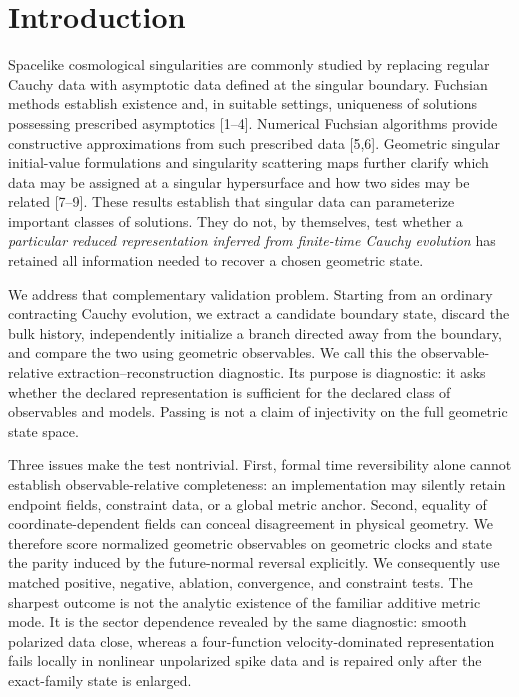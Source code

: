 \documentclass{iopjournal}
\begin{document}
\section{Introduction}
Spacelike cosmological singularities are commonly studied by replacing regular Cauchy data with asymptotic data defined at the singular boundary. Fuchsian methods establish existence and, in suitable settings, uniqueness of solutions possessing prescribed asymptotics [1--4]. Numerical Fuchsian algorithms provide constructive approximations from such prescribed data [5,6]. Geometric singular initial-value formulations and singularity scattering maps further clarify which data may be assigned at a singular hypersurface and how two sides may be related [7--9]. These results establish that singular data can parameterize important classes of solutions. They do not, by themselves, test whether a \emph{particular reduced representation inferred from finite-time Cauchy evolution} has retained all information needed to recover a chosen geometric state.

We address that complementary validation problem. Starting from an ordinary contracting Cauchy evolution, we extract a candidate boundary state, discard the bulk history, independently initialize a branch directed away from the boundary, and compare the two using geometric observables. We call this the observable-relative extraction--reconstruction diagnostic. Its purpose is diagnostic: it asks whether the declared representation is sufficient for the declared class of observables and models. Passing is not a claim of injectivity on the full geometric state space.

Three issues make the test nontrivial. First, formal time reversibility alone cannot establish observable-relative completeness: an implementation may silently retain endpoint fields, constraint data, or a global metric anchor. Second, equality of coordinate-dependent fields can conceal disagreement in physical geometry. We therefore score normalized geometric observables on geometric clocks and state the parity induced by the future-normal reversal explicitly. We consequently use matched positive, negative, ablation, convergence, and constraint tests. The sharpest outcome is not the analytic existence of the familiar additive metric mode. It is the sector dependence revealed by the same diagnostic: smooth polarized data close, whereas a four-function velocity-dominated representation fails locally in nonlinear unpolarized spike data and is repaired only after the exact-family state is enlarged.
\end{document}

